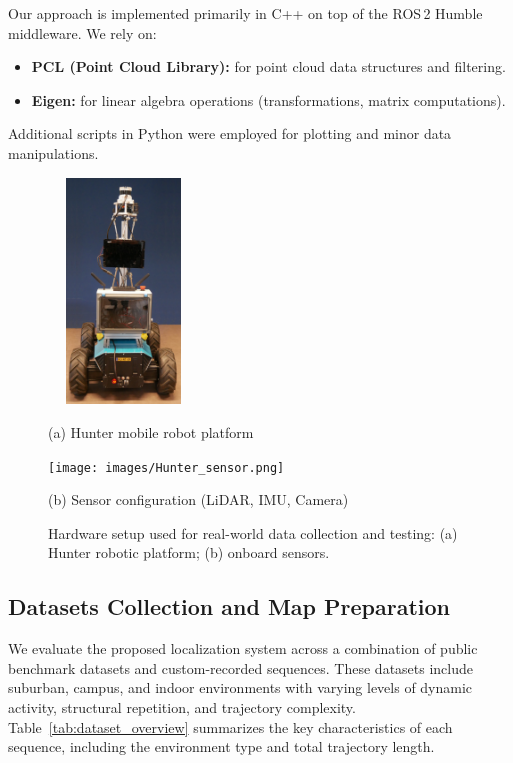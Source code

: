 Our approach is implemented primarily in C++ on top of the ROS\,2 Humble middleware. We rely on:
\begin{itemize}
	\item \textbf{PCL (Point Cloud Library):} for point cloud data structures and filtering.
	\item \textbf{Eigen:} for linear algebra operations (transformations, matrix computations).
	
\end{itemize}
Additional scripts in Python were employed for plotting and minor data manipulations.
\begin{figure}[H]
	\centering
	\begin{minipage}{0.45\textwidth}
		\centering
		\includegraphics[height=6cm , width=4cm]{images/Hunter_body.png}
		\caption*{(a) Hunter mobile robot platform}
	\end{minipage}\hfill
	\begin{minipage}{0.45\textwidth}
		\centering
		\texttt{[image: images/Hunter\_sensor.png]}
		\caption*{(b) Sensor configuration (LiDAR, IMU, Camera)}
	\end{minipage}
	\caption{Hardware setup used for real-world data collection and testing: (a) Hunter robotic platform; (b) onboard sensors.}
	\label{fig:hunter-robot-setup}
\end{figure}



\subsection{Datasets Collection and Map Preparation}
We evaluate the proposed localization system across a combination of public benchmark datasets and custom-recorded sequences. These datasets include suburban, campus, and indoor environments with varying levels of dynamic activity, structural repetition, and trajectory complexity. Table~\ref{tab:dataset_overview} summarizes the key characteristics of each sequence, including the environment type and total trajectory length.


